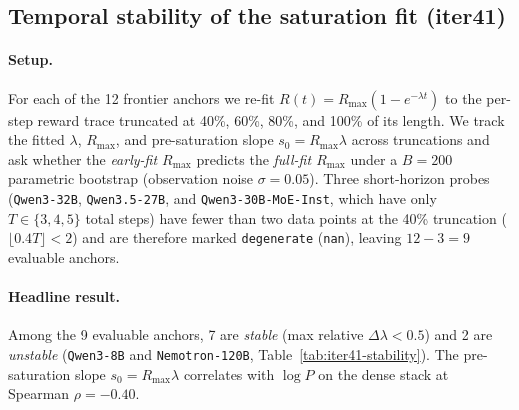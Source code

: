 \subsection{Temporal stability of the saturation fit (iter41)}
\label{sec:scaling-law-iter41}
\label{sec:iter41}
\paragraph{Setup.} For each of the 12 frontier anchors we re-fit $R(t)=R_{\max}(1-e^{-\lambda t})$ to the per-step reward trace truncated at 40\%, 60\%, 80\%, and 100\% of its length. We track the fitted $\lambda$, $R_{\max}$, and pre-saturation slope $s_0=R_{\max}\lambda$ across truncations and ask whether the \emph{early-fit $R_{\max}$} predicts the \emph{full-fit $R_{\max}$} under a $B=200$ parametric bootstrap (observation noise $\sigma=0.05$). Three short-horizon probes (\texttt{Qwen3-32B}, \texttt{Qwen3.5-27B}, and \texttt{Qwen3-30B-MoE-Inst}, which have only $T \in \{3, 4, 5\}$ total steps) have fewer than two data points at the 40\% truncation ($\lfloor 0.4 T \rfloor < 2$) and are therefore marked \texttt{degenerate} (\texttt{nan}), leaving $12 - 3 = 9$ evaluable anchors.
\paragraph{Headline result.}
 Among the 9 evaluable anchors, 7 are \textit{stable} (max relative $\Delta\lambda<0.5$) and 2 are \textit{unstable} (\texttt{Qwen3-8B} and \texttt{Nemotron-120B}, Table~\ref{tab:iter41-stability}). The pre-saturation slope $s_0=R_{\max}\lambda$ correlates with $\log P$ on the dense stack at Spearman $\rho=-0.40$.
